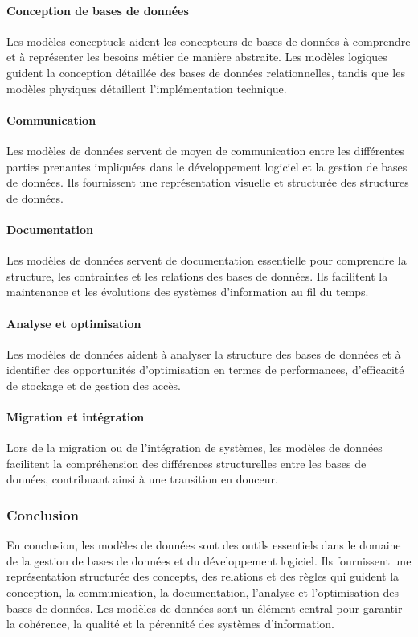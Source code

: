 \documentclass{article}
\begin{document}
	\paragraph{Conception de bases de données}
	Les modèles conceptuels aident les concepteurs de bases de données à comprendre et à représenter les besoins métier de manière abstraite. Les modèles logiques guident la conception détaillée des bases de données relationnelles, tandis que les modèles physiques détaillent l’implémentation technique.
	
	\paragraph{Communication}
	Les modèles de données servent de moyen de communication entre les différentes parties prenantes impliquées dans le développement logiciel et la gestion de bases de données. Ils fournissent une représentation visuelle et structurée des structures de données.
	
	\paragraph{Documentation}
	Les modèles de données servent de documentation essentielle pour comprendre la structure, les contraintes et les relations des bases de données. Ils facilitent la maintenance et les évolutions des systèmes d’information au fil du temps.
	
	\paragraph{Analyse et optimisation}
	Les modèles de données aident à analyser la structure des bases de données et à identifier des opportunités d’optimisation en termes de performances, d’efficacité de stockage et de gestion des accès.
	
	\paragraph{Migration et intégration}
	Lors de la migration ou de l’intégration de systèmes, les modèles de données facilitent la compréhension des différences structurelles entre les bases de données, contribuant ainsi à une transition en douceur.
	
	\subsubsection{Conclusion}
	En conclusion, les modèles de données sont des outils essentiels dans le domaine de la gestion de bases de données et du développement logiciel. Ils fournissent une représentation structurée des concepts, des relations et des règles qui guident la conception, la communication, la documentation, l’analyse et l’optimisation des bases de données. Les modèles de données sont un élément central pour garantir la cohérence, la qualité et la pérennité des systèmes d’information.
	
\end{document}
